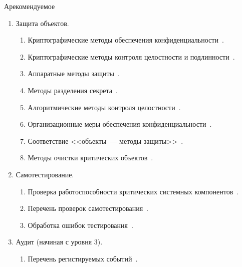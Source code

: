 \begin{appendix}{А}{рекомендуемое}
\begin{enumerate}
\begin{enumerate}
\item
Состояния СКЗИ и правила перехода между состояниями~.
\end{enumerate}

\item
{Защита объектов.}

\begin{enumerate}
\item
Криптографические методы обеспечения конфиденциальности~.

\item
Криптографические методы контроля целостности и 
подлинности~. 

\item
Аппаратные методы защиты~.

\item
Методы разделения секрета~.

\item
Алгоритмические методы контроля целостности~.

\item
Организационные меры обеспечения конфиденциальности~.

\item
Соответствие <<объекты~--- методы защиты>>~.

\item
Методы очистки критических объектов~.
\end{enumerate}

\item
{Самотестирование.}

\begin{enumerate}
\item
Проверка работоспособности критических системных компонентов~.

\item
Перечень проверок самотестирования~.

\item
Обработка ошибок тестирования~.
\end{enumerate}

\item
Аудит (начиная с уровня 3).

\begin{enumerate}
\item
Перечень регистируемых событий~.


\end{enumerate}
\end{enumerate}
\end{appendix}

